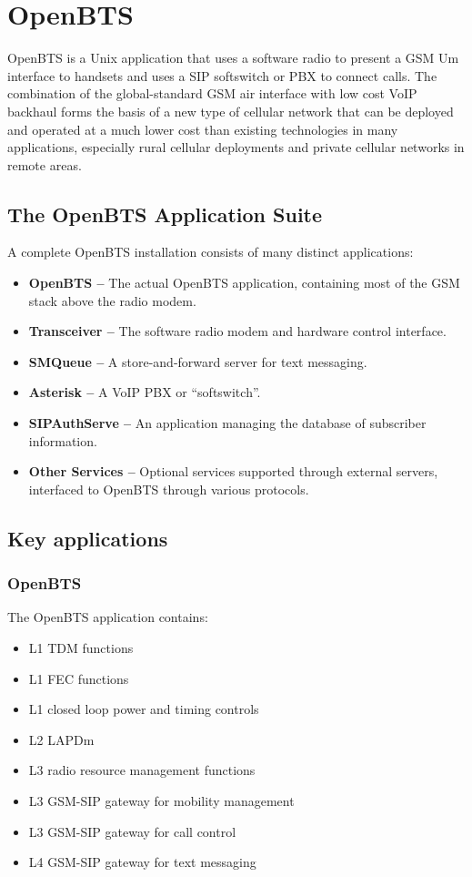 \chapter{OpenBTS}

OpenBTS is a Unix application that uses a software radio to present a GSM Um interface 
to handsets and uses a SIP softswitch or PBX to connect calls.
The combination of the global-standard GSM air interface with low cost VoIP backhaul 
forms the basis of a new type of cellular network that can be deployed and operated at a much lower
cost than existing technologies in many applications, 
especially rural cellular deployments and private cellular networks in remote areas.

\section{The OpenBTS Application Suite}
A complete OpenBTS installation consists of many distinct applications:

\begin{itemize}
\item \textbf{OpenBTS --} The actual OpenBTS application, containing most of
the GSM stack above the radio modem.
\item \textbf{Transceiver --} The software radio modem and hardware control interface.
\item \textbf{SMQueue --} A store-and-forward server for text messaging.
\item \textbf{Asterisk --} A VoIP PBX or ``softswitch''.
\item \textbf{SIPAuthServe --} An application managing the database of subscriber information.
\item \textbf{Other Services --} Optional services supported through 
external servers, interfaced to OpenBTS through various protocols.
\end{itemize}

\section{Key applications}
\subsection{OpenBTS}
The OpenBTS application contains:
\begin{itemize}
\item L1 TDM functions
\item L1 FEC functions
\item L1 closed loop power and timing controls
\item L2 LAPDm
\item L3 radio resource management functions
\item L3 GSM-SIP gateway for mobility management
\item L3 GSM-SIP gateway for call control
\item L4 GSM-SIP gateway for text messaging
\end{itemize}

